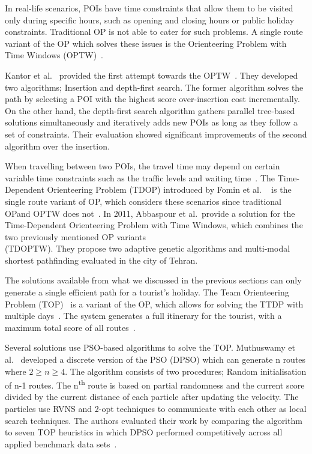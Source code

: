 In real-life scenarios, POIs have time constraints that allow them to be
visited only during specific hours, such as opening and closing hours or public
holiday constraints. Traditional OP is not able to cater for such problems. A
single route variant of the OP which solves these issues is the Orienteering
Problem with Time Windows (OPTW)~\cite{Gavalas2014a}. 

Kantor et al.~\cite{Kantor1992} provided the first attempt towards the
OPTW~\cite{Vansteenwegen2011}. They developed two algorithms;
Insertion and depth-first search. The former algorithm solves the path by
selecting a POI with the highest score over-insertion cost incrementally. On
the other hand, the depth-first search algorithm gathers parallel tree-based
solutions simultaneously and iteratively adds new POIs as long as they follow a
set of constraints. Their evaluation showed significant improvements of the
second algorithm over the insertion. 

When travelling between two POIs, the travel time may depend on certain
variable time constraints such as the traffic levels and waiting time~\cite{Herzog2020}.
The Time-Dependent Orienteering Problem (TDOP) introduced by Fomin et al.
~\cite{Fomin2002} is the single route variant of OP, which considers
these scenarios since traditional OPand OPTW does not~\cite{Gunawan2016}. In 2011, Abbaspour et
al.~\cite{Abbaspour2011}provide a solution for the
Time-Dependent Orienteering Problem with Time Windows, which combines the two
previously mentioned OP variants \\(TDOPTW).  They propose two adaptive genetic
algorithms and multi-modal shortest pathfinding evaluated in the city of
Tehran.



The solutions available from what we discussed in the previous sections can only
generate a single efficient path for a tourist's holiday. The Team Orienteering
Problem (TOP)~\cite{Chao1996} is a variant of the OP, which allows for
solving the TTDP with multiple days~\cite{Sylejmani2017}. The system generates a full
itinerary for the tourist, with a maximum total score of all routes~\cite{Herzog2020}.

Several solutions use PSO-based algorithms to solve the TOP.
Muthuswamy et al.~\cite{Muthuswamy2011} developed a discrete version of the PSO (DPSO)
which can generate n routes where $2 \geq n \geq 4$. The algorithm consists of two procedures;
Random initialisation of n-1 routes. The n\textsuperscript{th}
route is based on partial randomness and the current score divided by the current
distance of each particle after updating the velocity.  The
particles use RVNS and 2-opt techniques to communicate with each other as local
search techniques. The authors evaluated their work by comparing the algorithm
to seven TOP heuristics in which DPSO performed competitively across all
applied benchmark data sets~\cite{Gavalas2014a}.

